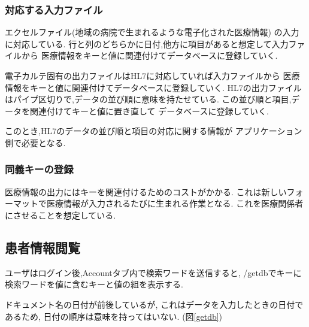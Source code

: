 	\subsubsection{対応する入力ファイル}
	エクセルファイル(地域の病院で生まれるような電子化された医療情報)
	の入力に対応している.
	行と列のどちらかに日付,他方に項目があると想定して入力ファイルから
	医療情報をキーと値に関連付けてデータベースに登録していく.

	電子カルテ固有の出力ファイルはHL7に対応していれば入力ファイルから
	医療情報をキーと値に関連付けてデータベースに登録していく.
	HL7の出力ファイルはパイプ区切りで,データの並び順に意味を持たせている.
	この並び順と項目,データを関連付けてキーと値に置き直して
	データベースに登録していく.

	このとき,HL7のデータの並び順と項目の対応に関する情報が
	アプリケーション側で必要となる.



	\subsubsection{同義キーの登録}
	医療情報の出力にはキーを関連付けるためのコストがかかる.
	これは新しいフォーマットで医療情報が入力されるたびに生まれる作業となる.
	これを医療関係者にさせることを想定している.


\subsection{患者情報閲覧}

	ユーザはログイン後,Accountタブ内で検索ワードを送信すると,
	/getdbでキーに検索ワードを値に含むキーと値の組を表示する.

	ドキュメント名の日付が前後しているが,
	これはデータを入力したときの日付であるため,
	日付の順序は意味を持ってはいない.
	(図\ref{getdb})


